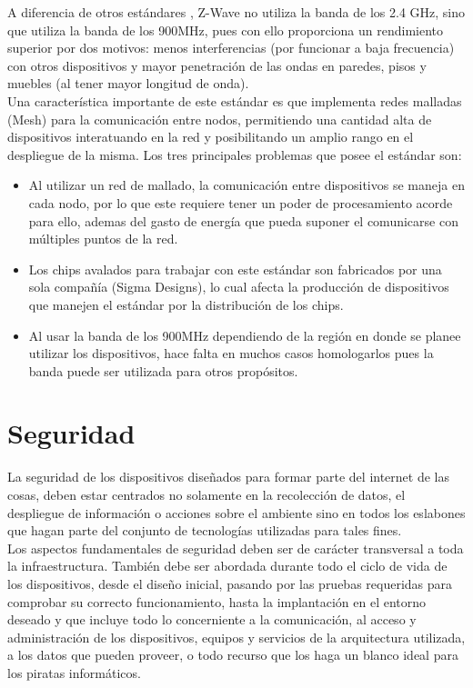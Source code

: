 A diferencia de otros estándares , Z-Wave no utiliza la banda de los 2.4 GHz, sino que utiliza la banda de los 900MHz, pues con ello proporciona un rendimiento superior por dos motivos: menos interferencias (por funcionar a baja frecuencia) con otros dispositivos y mayor penetración de las ondas en paredes, pisos y muebles (al tener mayor longitud de onda).\cite{pandomzwave}\\

Una característica importante de este estándar es que  implementa redes malladas (Mesh) para la comunicación entre nodos, permitiendo una cantidad alta de dispositivos interatuando en la red y posibilitando un amplio rango en el despliegue de la misma. Los tres principales problemas que posee el estándar son:
\begin{itemize}
\item  Al utilizar un red de mallado, la comunicación entre dispositivos se maneja en cada nodo, por lo que este requiere tener un poder de procesamiento acorde para ello, ademas del gasto de energía que pueda suponer el comunicarse con múltiples puntos de la red.
\item Los chips avalados para trabajar con este estándar son fabricados por una sola compañía (Sigma Designs), lo cual afecta la producción de dispositivos  que manejen el estándar por la distribución de los chips.
\item Al usar la banda de los 900MHz dependiendo de la región en donde se planee utilizar los dispositivos, hace falta en muchos casos homologarlos pues la banda puede ser utilizada para otros propósitos.
\end{itemize}

\section{Seguridad}
La seguridad de los dispositivos diseñados para formar parte del internet de las cosas, deben estar centrados no solamente en la recolección de datos, el despliegue de información o acciones sobre el ambiente sino en todos los eslabones que hagan parte del conjunto de tecnologías utilizadas para tales fines.\\

Los aspectos fundamentales de seguridad deben ser de carácter transversal a toda la infraestructura. También debe ser abordada durante todo el ciclo de vida de los dispositivos, desde el diseño inicial, pasando por las pruebas requeridas para comprobar su correcto funcionamiento, hasta la implantación en el entorno deseado y que incluye todo lo concerniente a la comunicación, al acceso y administración de los dispositivos, equipos y servicios de la arquitectura utilizada, a los datos que pueden proveer, o todo recurso que los haga un blanco ideal para los piratas informáticos.\\

